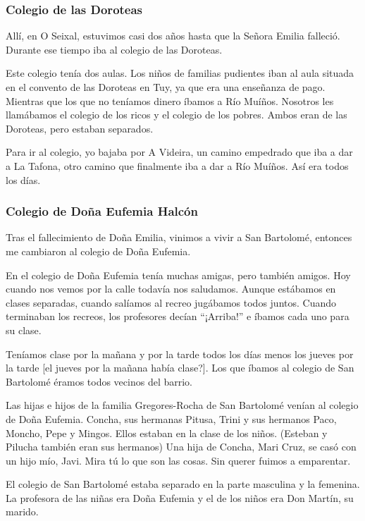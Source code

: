 \documentclass[12pt,a5paper]{book}
\begin{document}
\subsubsection*{Colegio de las Doroteas}

Allí, en O Seixal, estuvimos casi dos años hasta que la Señora Emilia falleció. Durante ese tiempo iba al colegio de las Doroteas.

Este colegio tenía dos aulas. Los niños de familias pudientes iban al aula situada en el convento de las Doroteas en Tuy, ya que era una enseñanza de pago. Mientras que los que no teníamos dinero íbamos a Río Muíños. Nosotros les llamábamos el colegio de los ricos y el colegio de los pobres. Ambos eran de las Doroteas, pero estaban separados.

Para ir al colegio, yo bajaba por A Videira, un camino empedrado que iba a dar a La Tafona, otro camino que finalmente iba a dar a Río Muíños. Así era todos los días.


\subsubsection*{Colegio de Doña Eufemia Halcón}

Tras el fallecimiento de Doña Emilia, vinimos a vivir a San Bartolomé, entonces me cambiaron al colegio de Doña Eufemia. 

En el colegio de Doña Eufemia tenía muchas amigas, pero también amigos. Hoy cuando nos vemos por la calle todavía nos saludamos. Aunque estábamos en clases separadas, cuando salíamos al recreo jugábamos todos juntos. Cuando terminaban los recreos, los profesores decían “¡Arriba!” e íbamos cada uno para su clase. 

Teníamos clase por la mañana y por la tarde todos los días menos los jueves por la tarde [el jueves por la mañana había clase?]. Los que íbamos al colegio de San Bartolomé éramos todos vecinos del barrio.

Las hijas e hijos de la familia Gregores-Rocha de San Bartolomé venían al colegio de Doña Eufemia. Concha, sus hermanas Pitusa, Trini y sus hermanos Paco, Moncho, Pepe y Mingos. Ellos estaban en la clase de los niños. (Esteban y Pilucha también eran sus hermanos)
Una hija de Concha, Mari Cruz, se casó con un hijo mío, Javi. Mira tú lo que son las cosas. Sin querer fuimos a emparentar.

El colegio de San Bartolomé estaba separado en la parte masculina y la femenina. La profesora de las niñas era Doña Eufemia y el de los niños era Don Martín, su marido. 
\end{document}
